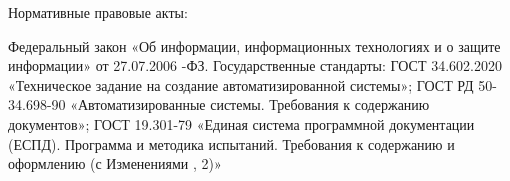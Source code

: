 \documentclass[russian, utf8, 12pt,pointsubsection,floatsubsection]{eskdtext}
\begin{document}
Нормативные правовые акты:
\begin{enumerate}
Федеральный закон «Об информации, информационных технологиях и о защите информации» от 27.07.2006 -ФЗ.
Государственные стандарты:
ГОСТ 34.602.2020 «Техническое задание на создание автоматизированной системы»;
ГОСТ РД 50-34.698-90 «Автоматизированные системы. Требования к содержанию документов»;
ГОСТ 19.301-79 «Единая система программной документации (ЕСПД). Программа и методика испытаний. Требования к содержанию и оформлению (с Изменениями , 2)»
\end{enumerate}
\end{document}
